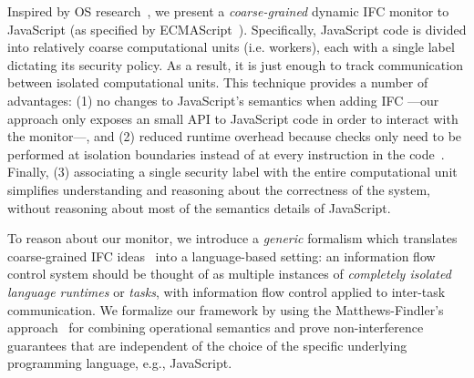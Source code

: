 Inspired by OS research~\cite{}, we present a \textit{coarse-grained} dynamic
IFC monitor to JavaScript (as specified by ECMAScript~\cite{}). Specifically,
JavaScript code is divided into relatively coarse computational units
(i.e. workers), each with a single label dictating its security policy. As a
result, it is just enough to track communication between isolated computational
units.
This technique provides a number of advantages: (1) no changes to JavaScript's
semantics when adding IFC ---our approach only exposes an small API to
JavaScript code in order to interact with the monitor---, and
(2) reduced runtime overhead because checks only need to be performed at isolation
boundaries instead of at every instruction in the code~\cite{JSFlow}.
Finally, (3) associating a single security label with the entire computational
unit simplifies understanding and reasoning about the correctness of the system,
without reasoning about most of the semantics details of JavaScript.

To reason about our monitor, we introduce a \emph{generic} formalism which
translates coarse-grained IFC ideas~\cite{Zeldovich:2006} into a language-based
setting: an information flow control system should be thought of as multiple
instances of \emph{completely isolated language runtimes} or \emph{tasks}, with
information flow control applied to inter-task communication.
We formalize our framework by using the Matthews-Findler's
approach~\cite{Matthews:2007:OSM:1190216.1190220} for combining operational
semantics and prove non-interference guarantees that are independent of the
choice of the specific underlying programming language, e.g., JavaScript.

